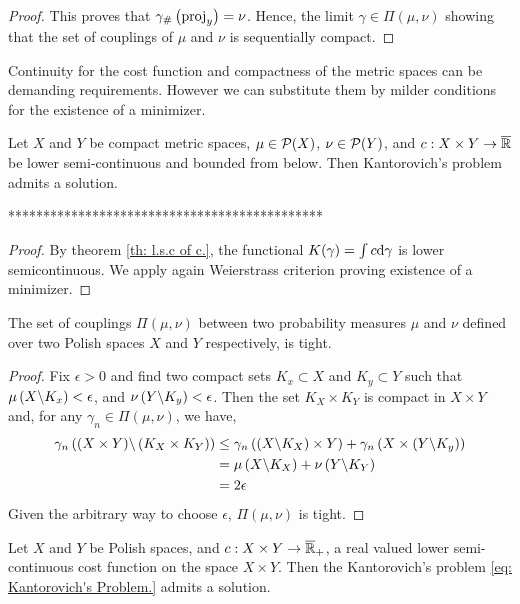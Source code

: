 \begin{theorem}
\begin{proof}
	This proves that ${\gamma}_{\#} \left( \mathrm{proj}_y \right)=\nu$. Hence, the limit $\gamma \in \Pi(\mu, \nu)$ showing that the set of couplings of $\mu$ and $\nu$ is sequentially compact. 
\end{proof}

Continuity for the cost function and compactness of the metric spaces can be demanding requirements. However we can substitute them by milder conditions for the existence of a minimizer. 

\begin{theorem}
	Let $X$ and $Y$ be compact metric spaces, $\mu \in \mathcal{P}(X)$, $\nu \in\mathcal{P}(Y)$, and $c:X\times Y\rightarrow \overline{\mathbb{R}} $  be lower semi-continuous and bounded from below. Then Kantorovich's problem admits a solution.
\end{theorem}
*********************************************
\begin{proof}
By theorem \ref{th: l.s.c of c.}, the functional $K(\gamma) =\int c\mathrm{d}\gamma$ is lower semicontinuous. We apply again Weierstrass criterion proving existence of a minimizer.
\end{proof}

\begin{lemma}
	The set of couplings $\Pi(\mu, \nu)$ between two probability measures $\mu$ and $\nu$ defined over two Polish spaces $X$ and $Y$ respectively, is tight.
\end{lemma}
\begin{proof}
Fix $\epsilon>0$ and find two compact sets $K_x\subset X$ and $K_y\subset Y$ such that $\mu\left( X\backslash K_x \right)<\epsilon$, and $\nu\left( Y\backslash K_y \right)<\epsilon$. Then the set $K_X\times K_Y$ is compact in $X\times Y$ and, for any $\gamma_n\in \Pi(\mu, \nu)$, we have,
\begin{align*}
\gamma_n\left( (X\times Y)\backslash \left( K_X\times K_Y \right) \right)&\leq \gamma_n\left( (X\backslash K_X)\times Y \right)+\gamma_n\left( X\times \left( Y\backslash K_y \right) \right)\\&=\mu\left( X\backslash K_X \right)+\nu\left( Y\backslash K_Y \right)\\&=2\epsilon
\end{align*}  
Given the arbitrary way to choose $\epsilon$, $\Pi(\mu,\nu)$ is tight.
\end{proof}

\begin{theorem}
Let $X$ and $Y$ be Polish spaces, and $c:X\times Y \rightarrow \overline{\mathbb{R}}_+$, a real valued lower semi-continuous cost function on the space $X\times Y$. Then the Kantorovich's problem \eqref{eq: Kantorovich's Problem.} admits a solution.
\end{theorem}


\end{theorem}
